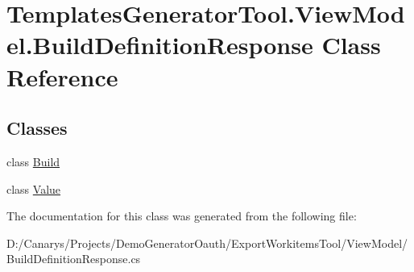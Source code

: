 \hypertarget{class_templates_generator_tool_1_1_view_model_1_1_build_definition_response}{}\section{Templates\+Generator\+Tool.\+View\+Model.\+Build\+Definition\+Response Class Reference}
\label{class_templates_generator_tool_1_1_view_model_1_1_build_definition_response}
\subsection*{Classes}
\begin{DoxyCompactItemize}
\item 
class \mbox{\hyperlink{class_templates_generator_tool_1_1_view_model_1_1_build_definition_response_1_1_build}{Build}}
\item 
class \mbox{\hyperlink{class_templates_generator_tool_1_1_view_model_1_1_build_definition_response_1_1_value}{Value}}
\end{DoxyCompactItemize}


The documentation for this class was generated from the following file\+:\begin{DoxyCompactItemize}
\item 
D\+:/\+Canarys/\+Projects/\+Demo\+Generator\+Oauth/\+Export\+Workitems\+Tool/\+View\+Model/Build\+Definition\+Response.\+cs\end{DoxyCompactItemize}
